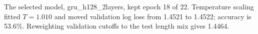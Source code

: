 The selected model, gru\_h128\_2layers, kept epoch 18 of 22. Temperature scaling fitted $T=1.010$ and moved validation log loss from 1.4521 to 1.4522; accuracy is 53.6\%. Reweighting validation cutoffs to the test length mix gives 1.4464.
